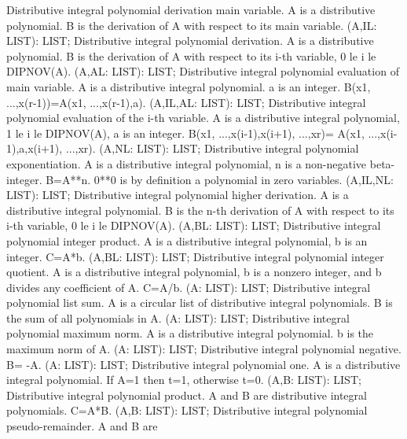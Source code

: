 \bcom Distributive integral polynomial derivation main variable.
A is a distributive polynomial. B is the derivation of A
with respect to its main variable. \ecom 
{} (A,IL: LIST): LIST; \eproc
\bcom Distributive integral polynomial derivation. A is a distributive
polynomial. B is the derivation of A with respect to its i-th
variable, 0 le i le DIPNOV(A). \ecom 
{} (A,AL: LIST): LIST; \eproc
\bcom Distributive integral polynomial evaluation of main variable.
A is a distributive integral polynomial. a is an integer.
B(x1, ...,x(r-1))=A(x1, ...,x(r-1),a).  \ecom 
{} (A,IL,AL: LIST): LIST; \eproc
\bcom Distributive integral polynomial evaluation of the i-th variable.
A is a distributive integral polynomial, 1 le i le DIPNOV(A),
a is an integer. B(x1, ...,x(i-1),x(i+1), ...,xr)=
A(x1, ...,x(i-1),a,x(i+1), ...,xr).  \ecom 
{} (A,NL: LIST): LIST; \eproc
\bcom Distributive integral polynomial exponentiation. A is a
distributive integral polynomial, n is a non-negative beta-
integer. B=A**n. 0**0 is by definition a polynomial in
zero variables.  \ecom 
{} (A,IL,NL: LIST): LIST; \eproc
\bcom Distributive integral polynomial higher derivation. A is a
distributive integral polynomial. B is the n-th derivation
of A with respect to its i-th variable, 0 le i le DIPNOV(A).  \ecom 
{} (A,BL: LIST): LIST; \eproc
\bcom Distributive integral polynomial integer product. A is a
distributive integral polynomial, b is an integer. C=A*b. \ecom 
{} (A,BL: LIST): LIST; \eproc
\bcom Distributive integral polynomial integer quotient. A is a
distributive integral polynomial, b is a nonzero integer,
and b divides any coefficient of A. C=A/b. \ecom 
{} (A: LIST): LIST; \eproc
\bcom Distributive integral polynomial list sum. A is a circular
list of distributive integral polynomials. B is the sum of all
polynomials in A.  \ecom 
{} (A: LIST): LIST; \eproc
\bcom Distributive integral polynomial maximum norm. A is a
distributive integral polynomial. b is the maximum norm of A. \ecom 
{} (A: LIST): LIST; \eproc
\bcom Distributive integral polynomial negative. B= -A. \ecom 
{} (A: LIST): LIST; \eproc
\bcom Distributive integral polynomial one. A is a distributive
integral polynomial. If A=1 then t=1, otherwise t=0. \ecom 
{} (A,B: LIST): LIST; \eproc
\bcom Distributive integral polynomial product. A and B are
distributive integral polynomials. C=A*B. \ecom 
{} (A,B: LIST): LIST; \eproc
\bcom Distributive integral polynomial pseudo-remainder. A and B are
